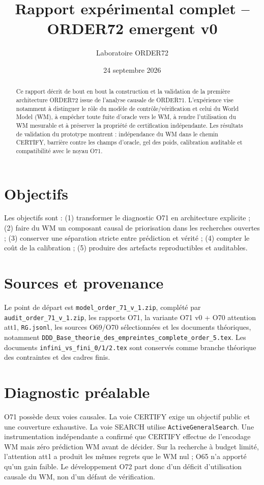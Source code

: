 \documentclass[11pt,a4paper]{article}
\title{Rapport expérimental complet -- ORDER72 emergent v0}
\author{Laboratoire ORDER72}
\date{24 septembre 2026}
\begin{document}
\maketitle
\begin{abstract}
Ce rapport décrit de bout en bout la construction et la validation de la première architecture ORDER72 issue de l'analyse causale de ORDER71. L'expérience vise notamment à distinguer le rôle du modèle de contrôle/vérification et celui du World Model (WM), à empêcher toute fuite d'oracle vers le WM, à rendre l'utilisation du WM mesurable et à préserver la propriété de certification indépendante. Les résultats de validation du prototype montrent : indépendance du WM dans le chemin CERTIFY, barrière contre les champs d'oracle, gel des poids, calibration auditable et compatibilité avec le noyau O71.
\end{abstract}
\tableofcontents
\section{Objectifs}
Les objectifs sont : (1) transformer le diagnostic O71 en architecture explicite ; (2) faire du WM un composant causal de priorisation dans les recherches ouvertes ; (3) conserver une séparation stricte entre prédiction et vérité ; (4) compter le coût de la calibration ; (5) produire des artefacts reproductibles et auditables.
\section{Sources et provenance}
Le point de départ est \texttt{model\_order\_71\_v\_1.zip}, complété par \texttt{audit\_order\_71\_v\_1.zip}, les rapports O71, la variante O71 v0 + O70 attention att1, \texttt{RG.jsonl}, les sources O69/O70 sélectionnées et les documents théoriques, notamment \texttt{DDD\_Base\_theorie\_des\_empreintes\_complete\_order\_5.tex}. Les documents \texttt{infini\_vs\_fini\_0/1/2.tex} sont conservés comme branche théorique des contraintes et des cadres finis.
\section{Diagnostic préalable}
O71 possède deux voies causales. La voie CERTIFY exige un objectif public et une couverture exhaustive. La voie SEARCH utilise \texttt{ActiveGeneralSearch}. Une instrumentation indépendante a confirmé que CERTIFY effectue de l'encodage WM mais zéro prédiction WM avant de décider. Sur la recherche à budget limité, l'attention att1 a produit les mêmes regrets que le WM nul ; O65 n'a apporté qu'un gain faible. Le développement O72 part donc d'un déficit d'utilisation causale du WM, non d'un défaut de vérification.
\end{document}
